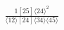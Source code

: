 \documentclass[varwidth, border=5pt]{standalone}
\begin{document}
\begin{my}
$\begin{gathered}
\scriptscriptstyle\frac{1[25]⟨24⟩^2}{⟨12⟩[24]⟨34⟩⟨45⟩}
\end{gathered}$
\end{my}
\end{document}
